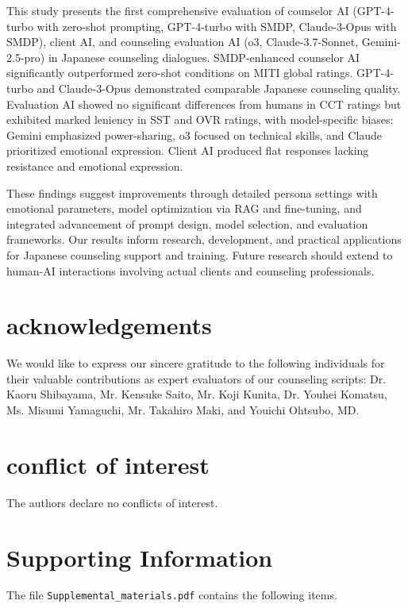 \documentclass{wiley-article}
\begin{document}
This study presents the first comprehensive evaluation of counselor AI (GPT-4-turbo with zero-shot prompting, GPT-4-turbo with SMDP, Claude-3-Opus with SMDP), client AI, and counseling evaluation AI (o3, Claude-3.7-Sonnet, Gemini-2.5-pro) in Japanese counseling dialogues. SMDP-enhanced counselor AI significantly outperformed zero-shot conditions on MITI global ratings. GPT-4-turbo and Claude-3-Opus demonstrated comparable Japanese counseling quality. Evaluation AI showed no significant differences from humans in CCT ratings but exhibited marked leniency in SST and OVR ratings, with model-specific biases: Gemini emphasized power-sharing, o3 focused on technical skills, and Claude prioritized emotional expression. Client AI produced flat responses lacking resistance and emotional expression.

These findings suggest improvements through detailed persona settings with emotional parameters, model optimization via RAG and fine-tuning, and integrated advancement of prompt design, model selection, and evaluation frameworks. Our results inform research, development, and practical applications for Japanese counseling support and training. Future research should extend to human-AI interactions involving actual clients and counseling professionals.



\section*{acknowledgements}
We would like to express our sincere gratitude to the following individuals for their valuable contributions as expert evaluators of our counseling scripts: Dr. Kaoru Shibayama, Mr. Kensuke Saito, Mr. Koji Kunita, Dr. Youhei Komatsu, Ms. Misumi Yamaguchi, Mr. Takahiro Maki, and Youichi Ohtsubo, MD.

\section*{conflict of interest}
The authors declare no conflicts of interest.

\section*{Supporting Information}

The file \texttt{Supplemental\_materials.pdf} contains the following items.
\end{document}
